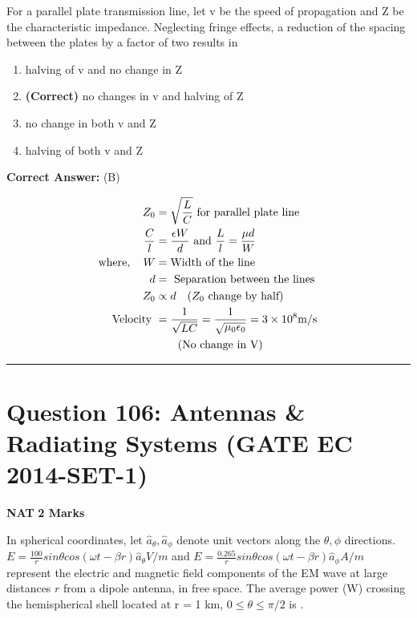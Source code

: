 \documentclass[11pt,a4paper]{article}
\begin{document}
\noindent For a parallel plate transmission line, let v be the speed of propagation and Z
be the characteristic impedance. Neglecting fringe effects, a reduction of the
spacing between the plates by a factor of two results in


\begin{enumerate}[label=(\Alph*)]
    \item halving of v and no change in Z
    \item \textbf{(Correct)} no changes in v and halving of Z
    \item no change in both v and Z
    \item halving of both v and Z
\end{enumerate}

\noindent \textbf{Correct Answer:} (B)

\begin{tcolorbox}[solbox, title=Detailed Solution -- Question 105]
\[
\begin{aligned} Z_{0}&=\sqrt{\frac{L}{C}} \text{ for parallel plate line}\\ \frac{C}{l}&=\frac{\epsilon W}{d} \text{ and } \frac{L}{l}=\frac{\mu d}{W} \\ \text{where}, \quad W&= \text{Width of the line}\\ d &=\text { Separation between the lines } \\ Z_{0} & \propto d \quad (Z_{0}\text{ change by half})\\ \text { Velocity } &=\frac{1}{\sqrt{L C}}=\frac{1}{\sqrt{\mu_{0} \epsilon_{0}}}=3 \times 10^{8} \mathrm{m} / \mathrm{s}\\ &\qquad\text{(No change in V)} \end{aligned}\\
\]
\end{tcolorbox}

\vspace{1.5em}
\hrule
\vspace{1.5em}

\section*{Question 106: Antennas \& Radiating Systems (GATE EC 2014-SET-1)}
\noindent \textbf{\color{primary}NAT} \hfill \textbf{\color{secondary}2 Marks}


\noindent In spherical coordinates, let $\hat{a}_{\theta },\hat{a}_{\phi }$
denote unit vectors along the $\theta, \phi$  directions. 
$E=\frac{100}{r}sin\theta cos(\omega t-\beta r)\hat{a}_\theta V/m$ 
 and 
  $E=\frac{0.265}{r}sin\theta cos(\omega t-\beta r)\hat{a}_\phi A/m$  
  represent the electric and magnetic field components of the EM wave at large
distances $r$  from a dipole antenna, in free space. The average power (W) crossing
the hemispherical shell located at r = 1 km, $0\leq \theta \leq \pi /2$ is \underline{\hspace{1.5cm}}.
\end{document}
